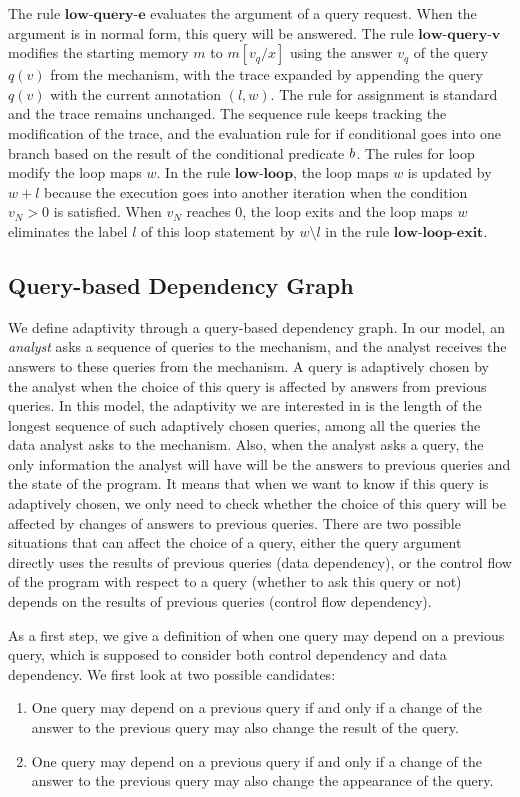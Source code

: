 The rule $\textbf{low-query-e}$ evaluates the argument of a query request. When the argument is in normal form, this query will be answered. The rule $\textbf{low-query-v}$ modifies the starting memory $m$ to $m[v_q/x]$ using the answer $v_q$ of the query $q(v)$ from the mechanism, with the trace expanded by appending the query $q(v)$ with the current annotation $(l,w)$. The rule for assignment is standard and the trace remains unchanged. The sequence rule keeps tracking the modification of the trace, and the evaluation rule for if conditional goes into one branch based on the result of the conditional predicate $b$. The rules for loop modify the loop maps $w$. In the rule $\textbf{low-loop}$, the loop maps $w$ is updated by $w + l$ because the execution goes into another iteration when the condition $v_N >0$ is satisfied. When $v_N$ reaches $0$, the loop exits and the loop maps $w$ eliminates the label $l$ of this loop statement by $w \setminus l$ in the rule $\textbf{low-loop-exit}$.     
%
\subsection{ Query-based Dependency Graph}
%
We define adaptivity through a query-based dependency graph. In our model, an \emph{analyst} asks a sequence of queries to the mechanism, and the analyst receives the answers to these queries from the mechanism. A query is adaptively chosen by the analyst when the choice of this query is affected by answers from previous queries. In this model, the adaptivity we are interested in is the length of the longest sequence of such adaptively chosen queries, among all the queries the data analyst asks to the mechanism.  Also, when the analyst asks a query, the only information the analyst will have will be the answers to previous queries and the state of the program. It means that when we want to know if this query is adaptively chosen, we only need to check whether the choice of this query will be affected by changes of answers to previous queries. There are two possible situations that can  affect the choice of a query,  
either the query argument directly uses the results of previous queries (data dependency), or the control flow of the program with respect to a query (whether to ask this query or not) depends on the results of previous queries (control flow dependency).

As a first step, we give a definition of when one query may depend on a previous query, which is supposed to consider both control dependency and data dependency. We first look at two possible candidates:
\begin{enumerate}
    \item One query may depend on a previous query if and only if a change of the answer to the previous query may also change the result of the query.
    \item One query may depend on a previous query if and only if a change of the answer to the previous query may also change the appearance of the query.
\end{enumerate}


